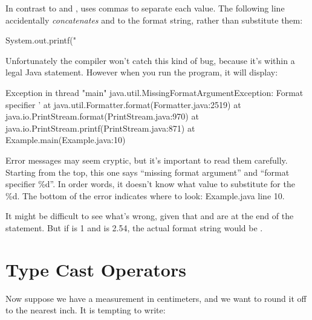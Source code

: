 In contrast to  and ,  uses commas to separate each value.
The following line accidentally {\em concatenates}  and  to the format string, rather than substitute them:

\begin{code}
System.out.printf("%
\end{code}

Unfortunately the compiler won't catch this kind of bug, because it's within a legal Java statement.
However when you run the program, it will display:


\begin{small}
\begin{stdout}
Exception in thread "main" java.util.MissingFormatArgumentException:
Format specifier '%
    at java.util.Formatter.format(Formatter.java:2519)
    at java.io.PrintStream.format(PrintStream.java:970)
    at java.io.PrintStream.printf(PrintStream.java:871)
    at Example.main(Example.java:10)
\end{stdout}
\end{small}

Error messages may seem cryptic, but it's important to read them carefully.
Starting from the top, this one says ``missing format argument'' and ``format specifier \%d''.
In order words, it doesn't know what value to substitute for the \%d.
The bottom of the error indicates where to look: Example.java line 10.

It might be difficult to see what's wrong, given that  and  are at the end of the  statement.
But if  is 1 and  is 2.54, the actual format string would be .


\section{Type Cast Operators}

Now suppose we have a measurement in centimeters, and we want to round it off to the nearest inch.
It is tempting to write:

